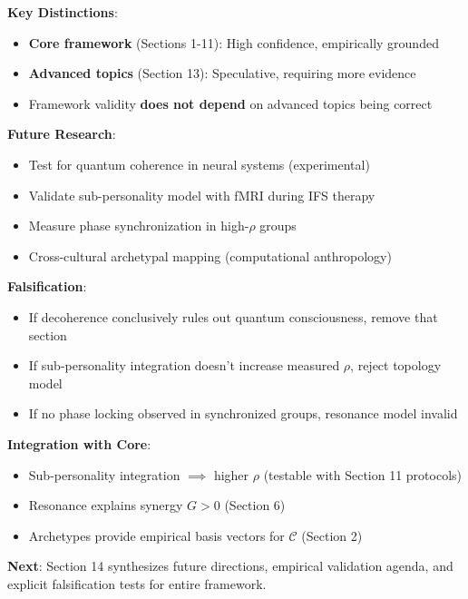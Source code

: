\documentclass[11pt,a4paper]{article}
\theoremstyle{definition}
\theoremstyle{remark}
\newcommand{\CC}{\mathcal{C}}
\begin{document}
\begin{small}
\begin{enumerate}
\begin{mdframed}[backgroundcolor=green!10,linewidth=2pt,linecolor=green!70!black]
\textbf{Key Distinctions}:
\begin{itemize}[nosep]
    \item \textbf{Core framework} (Sections 1-11): High confidence, empirically grounded
    \item \textbf{Advanced topics} (Section 13): Speculative, requiring more evidence
    \item Framework validity \textbf{does not depend} on advanced topics being correct
\end{itemize}

\textbf{Future Research}:
\begin{itemize}[nosep]
    \item Test for quantum coherence in neural systems (experimental)
    \item Validate sub-personality model with fMRI during IFS therapy
    \item Measure phase synchronization in high-\(\rho\) groups
    \item Cross-cultural archetypal mapping (computational anthropology)
\end{itemize}

\textbf{Falsification}:
\begin{itemize}[nosep]
    \item If decoherence conclusively rules out quantum consciousness, remove that section
    \item If sub-personality integration doesn't increase measured \(\rho\), reject topology model
    \item If no phase locking observed in synchronized groups, resonance model invalid
\end{itemize}

\textbf{Integration with Core}:
\begin{itemize}[nosep]
    \item Sub-personality integration \(\implies\) higher \(\rho\) (testable with Section 11 protocols)
    \item Resonance explains synergy \(G > 0\) (Section 6)
    \item Archetypes provide empirical basis vectors for \(\CC\) (Section 2)
\end{itemize}

\textbf{Next}: Section 14 synthesizes future directions, empirical validation agenda, and explicit falsification tests for entire framework.
\end{mdframed}



\end{enumerate}
\end{small}
\end{document}
